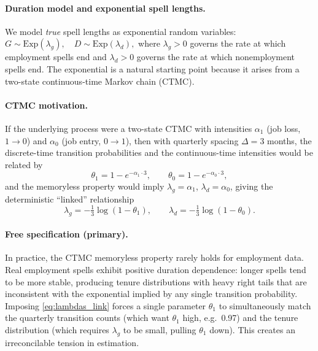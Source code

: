 \documentclass[12pt]{article}
\begin{document}
\paragraph{Duration model and exponential spell lengths.}
We model \emph{true} spell lengths as exponential random variables:
\(
G\sim \mathrm{Exp}(\lambda_g),\quad D\sim \mathrm{Exp}(\lambda_d),
\)
where \(\lambda_g>0\) governs the rate at which employment spells end and \(\lambda_d>0\) governs the rate at which nonemployment spells end. The exponential is a natural starting point because it arises from a two-state continuous-time Markov chain (CTMC).

\paragraph{CTMC motivation.}
If the underlying process were a two-state CTMC with intensities \(\alpha_1\) (job loss, \(1\to 0\)) and \(\alpha_0\) (job entry, \(0\to 1\)), then with quarterly spacing \(\Delta=3\) months, the discrete-time transition probabilities and the continuous-time intensities would be related by
\begin{equation}
\theta_1 = 1 - e^{-\alpha_1\cdot 3},\qquad
\theta_0 = 1 - e^{-\alpha_0\cdot 3},
\label{eq:ctmc_link}
\end{equation}
and the memoryless property would imply \(\lambda_g=\alpha_1\), \(\lambda_d=\alpha_0\), giving the deterministic ``linked'' relationship
\begin{equation}
\lambda_g = -\tfrac{1}{3}\log(1-\theta_1),\qquad
\lambda_d = -\tfrac{1}{3}\log(1-\theta_0).
\label{eq:lambdas_link}
\end{equation}

\paragraph{Free specification (primary).}
In practice, the CTMC memoryless property rarely holds for employment data. Real employment spells exhibit positive duration dependence: longer spells tend to be more stable, producing tenure distributions with heavy right tails that are inconsistent with the exponential implied by any single transition probability. Imposing \eqref{eq:lambdas_link} forces a single parameter \(\theta_1\) to simultaneously match the quarterly transition counts (which want \(\theta_1\) high, e.g.\ 0.97) and the tenure distribution (which requires \(\lambda_g\) to be small, pulling \(\theta_1\) down). This creates an irreconcilable tension in estimation.
\end{document}
